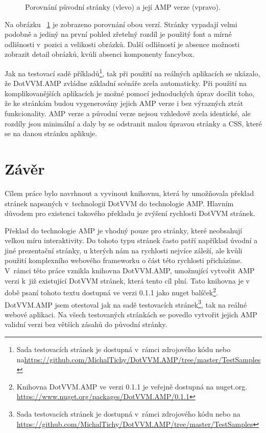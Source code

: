 \begin{figure}[!h]
	\caption{Porovnání původní stránky (vlevo) a její AMP verze (vpravo).}
	\label{originalVSamp}
\end{figure}

Na obrázku ~\ref{originalVSamp} je zobrazeno porovnání obou verzí. Stránky vypadají velmi podobně a jediný na první pohled zřetelný rozdíl je použitý font a mírné odlišnosti v~pozici a velikosti obrázků. Další odlišností je absence možnosti zobrazit detail obrázků, kvůli absenci komponenty fancybox.

Jak na testovací sadě příkladů\footnote{ Sada testovacích stránek je dostupná v~rámci zdrojového kódu nebo na\newline \url{https://github.com/MichalTichy/DotVVM.AMP/tree/master/TestSamples}}, tak při použití na reálných aplikacích se ukázalo, že DotVVM.AMP zvládne základní scénáře zcela automaticky. Při použití na komplikovanějších aplikacích je možné pomocí jednoduchých úprav docílit toho, že ke stránkám budou vygenerovány jejich AMP verze i bez výrazných ztrát funkcionality. AMP verze a původní verze nejsou vzhledově zcela identické, ale rozdíly jsou minimální a daly by se odstranit malou úpravou stránky a CSS, které se na danou stránku aplikuje.

\chapter{Závěr}
\setlength{\baselineskip}{0.92\baselineskip}
Cílem práce bylo navrhnout a vyvinout knihovnu, která by umožňovala překlad stránek napsaných v~technologii DotVVM do technologie AMP. Hlavním důvodem pro existenci takového překladu je zvýšení rychlosti DotVVM stránek.

Překlad do technologie AMP je vhodný pouze pro stránky, které neobsahují velkou míru interaktivity. Do tohoto typu stránek často patří například úvodní a jiné prezentační stránky, u kterých nám na rychlosti nejvíce záleží, ale kvůli použití komplexního webového frameworku o část této rychlosti přicházíme. V~rámci této práce vznikla knihovna DotVVM.AMP, umožnující vytvořit AMP verzi k~již existující DotVVM stránek, která tento cíl plní. Tato knihovna je v době psaní tohoto textu dostupná ve verzi 0.1.1 jako nuget balíček\footnote{Knihovna DotVVM.AMP ve verzi 0.1.1 je veřejně dostupná na nuget.org.
\url{https://www.nuget.org/packages/DotVVM.AMP/0.1.1}}. DotVVM.AMP jsem otestoval jak na sadě testovacích stránek\footnote{ Sada testovacích stránek je dostupná v~rámci zdrojového kódu nebo na \url{https://github.com/MichalTichy/DotVVM.AMP/tree/master/TestSamples}}, tak na reálné webové aplikaci. Na všech testovaných stránkách se povedlo vytvořit jejich AMP validní verzi bez větších zásahů do původní stránky.

